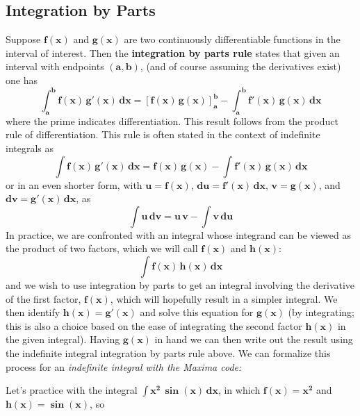 \documentclass[12pt]{article}
\begin{document}
\subsection{Integration by Parts}
Suppose $\mathbf{f(x)}$ and $\mathbf{g(x)}$ are two continuously differentiable functions
  in the interval of interest.
Then the \textbf{integration by parts rule} states that given an interval with
  endpoints $\mathbf{(a, b)}$, (and of course assuming the derivatives exist) one has  
\begin{equation}
\mathbf{\int_{a}^{b} f(x)\, g'(x)\, dx = [f(x)\,g(x)]_{a}^{b} - \int_{a}^{b} f'(x)\,g(x)\,dx}
\end{equation}
where the prime indicates differentiation.
This result follows from the product rule of differentiation.
This rule is often stated in the context of indefinite integrals as
\begin{equation}
\mathbf{\int f(x)\, g'(x)\, dx = f(x)\,g(x) - \int f'(x)\,g(x)\,dx}
\end{equation}
or in an even shorter form, with $\mathbf{u = f(x)}$, $\mathbf{du = f'(x)\,dx}$, $\mathbf{v = g(x)}$,
  and $\mathbf{dv = g'(x)\,dx}$, as
\begin{equation}
\mathbf{\int u\,dv = u\,v - \int v\,du}
\end{equation}
In practice, we are confronted with an integral whose integrand can be viewed
 as the product of two factors, which we will call $\mathbf{f(x)}$ and $\mathbf{h(x)}$:
 \begin{equation}
 \mathbf{\int f(x) \, h(x)\,dx}
 \end{equation}
 and we wish to use integration by parts to get an integral involving the
   derivative of the first factor, $\mathbf{f(x)}$, which will hopefully result in a
   simpler integral.
We then identify $\mathbf{h(x) = g'(x)}$ and solve this equation for $\mathbf{g(x)}$ (by integrating;
  this is also a choice based on the ease of integrating the second factor $\mathbf{h(x)}$
  in the given integral).
Having $\mathbf{g(x)}$ in hand we can then write out the result using the indefinite integral
  integration by parts rule above.
We can formalize this process for an \it indefinite integral \rm with the Maxima code:
Let's practice with the integral $$,
 in which $$ and $$, so
\end{document}
